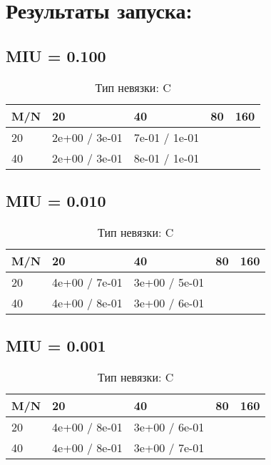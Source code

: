 \documentclass[a4paper,11pt]{article}
\begin{document}
\section{Результаты запуска:}
\subsection{MIU = 0.100}
\begin{table}[H]
\caption {Тип невязки: C   }
\begin{center}
\begin{tabular}{l|l|l|l|l}
\hline
M/N  & 20 & 40 & 80 & 160 \\ \hline
  20 & 2e+00 / 3e-01& 7e-01 / 1e-01\\ \hline
  40 & 2e+00 / 3e-01& 8e-01 / 1e-01\\ \hline
\end{tabular}
\end{center}
\end{table}



\subsection{MIU = 0.010}
\begin{table}[H]
\caption {Тип невязки: C   }
\begin{center}
\begin{tabular}{l|l|l|l|l}
\hline
M/N  & 20 & 40 & 80 & 160 \\ \hline
  20 & 4e+00 / 7e-01& 3e+00 / 5e-01\\ \hline
  40 & 4e+00 / 8e-01& 3e+00 / 6e-01\\ \hline
\end{tabular}
\end{center}
\end{table}



\subsection{MIU = 0.001}
\begin{table}[H]
\caption {Тип невязки: C   }
\begin{center}
\begin{tabular}{l|l|l|l|l}
\hline
M/N  & 20 & 40 & 80 & 160 \\ \hline
  20 & 4e+00 / 8e-01& 3e+00 / 6e-01\\ \hline
  40 & 4e+00 / 8e-01& 3e+00 / 7e-01\\ \hline
\end{tabular}
\end{center}
\end{table}
\end{document}
